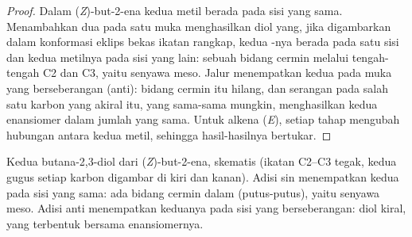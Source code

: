 \begin{proof}
Dalam (\textit{Z})-but-2-ena kedua metil berada pada sisi yang sama.
Menambahkan dua  pada satu muka menghasilkan diol yang, jika
digambarkan dalam konformasi eklips bekas ikatan rangkap, kedua -nya
berada pada satu sisi dan kedua metilnya pada sisi yang lain: sebuah bidang
cermin melalui tengah-tengah C2 dan C3, yaitu senyawa meso. Jalur 
menempatkan kedua  pada muka yang berseberangan (anti): bidang cermin
itu hilang, dan serangan pada salah satu karbon  yang akiral itu,
yang sama-sama mungkin, menghasilkan kedua enansiomer dalam jumlah yang
sama. Untuk alkena (\textit{E}), setiap tahap mengubah hubungan antara
kedua metil, sehingga hasil-hasilnya bertukar.
\end{proof}

\begin{omfigure}

{\small Kedua butana-2,3-diol dari (\textit{Z})-but-2-ena, skematis (ikatan
C2--C3 tegak, kedua gugus setiap karbon digambar di kiri dan kanan). Adisi
sin menempatkan kedua  pada sisi yang sama: ada bidang cermin dalam
(putus-putus), yaitu senyawa meso. Adisi anti menempatkan keduanya pada sisi
yang berseberangan: diol kiral, yang terbentuk bersama enansiomernya.}
\end{omfigure}


